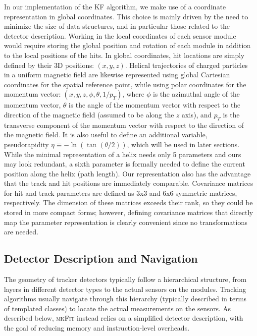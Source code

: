 \documentclass[a4paper,11pt]{article}
\newcommand{\mkFit}{\textsc{mkFit}\xspace}
\begin{document}
In our implementation of the KF algorithm, we make use of a coordinate representation in global coordinates. This choice is mainly driven by the need to minimize the size of data structures, and in particular those related to the detector description. Working in the local coordinates of each sensor module would require storing the global position and rotation of each module in addition to the local positions of the hits.
In global coordinates, hit locations are simply defined by their 3D positions: $(x,y,z)$.
Helical trajectories of charged particles in a uniform magnetic field are likewise represented using global Cartesian coordinates for the spatial reference point, while using polar coordinates for the momentum vector: $(x,y,z,\phi,\theta,1/p_{T})$, where $\phi$ is the azimuthal angle of the momentum vector, $\theta$ is the angle of the momentum vector with respect to the direction of the magnetic field (assumed to be along the $z$ axis), and $p_{T}$ is the transverse component of the momentum vector with respect to the direction of the magnetic field. 
It is also useful to define an additional variable, pseudorapidity $\eta\equiv-\ln(\tan(\theta/2))$, which will be used in later sections.
While the minimal representation of a helix needs only 5 parameters and ours may look redundant, a sixth parameter is formally needed to define the current position along the helix (path length). 
Our representation also has the advantage that the track and hit positions are immediately comparable.
Covariance matrices for hit and track parameters are defined as 3x3 and 6x6 symmetric matrices, respectively. 
The dimension of these matrices exceeds their rank, so they could be stored in more compact forms; however, defining covariance matrices that directly map the parameter representation is clearly convenient since no transformations are needed. 

\subsection{Detector Description and Navigation}
\label{sec:geom}

The geometry of tracker detectors typically follow a hierarchical structure, from layers in different detector types to the actual sensors on the modules. Tracking algorithms usually navigate through this hierarchy (typically described in terms of templated classes) to locate the actual measurements on the sensors. As described below, \mkFit instead relies on a simplified detector description, with the goal of reducing memory and instruction-level overheads.
\end{document}
